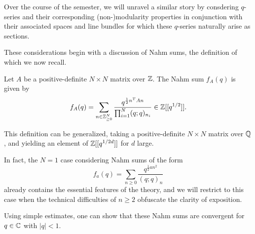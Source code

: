 Over the course of the semester, we will unravel a similar story by consdering $q$-series and their corresponding (non-)modularity properties in conjunction with their associated spaces and line bundles for which these $q$-series naturally arise as sections. 

These considerations begin with a discussion of Nahm sums, the definition of which we now recall. 
\begin{definition}\label{def: Nahm sum}
    Let $A$ be a positive-definite $N\times N$ matrix over $\mathbb{Z}$. The Nahm sum $f_{A}(q)$ is given by 
    $$f_{A}(q)=\sum_{n\in\mathbb{Z}_{\geq0}^{N}}\frac{q^{\frac{1}{2}n^{T}An}}{\prod_{i=1}^{N}(q;q)_{n_{i}}}\in\mathbb{Z}[[q^{1/2}]].$$
\end{definition}
\begin{remark}
    This definition can be generalized, taking a positive-definite $N\times N$ matrix over $\mathbb{Q}$, and yielding an element of $\mathbb{Z}[[q^{1/2d}]]$ for $d$ large. 
\end{remark}
\begin{remark}
    In fact, the $N=1$ case considering Nahm sums of the form 
    $$f_{a}(q)=\sum_{n\geq0}\frac{q^{\frac{1}{2}an^{2}}}{(q;q)_{n}}$$
    already contains the essential features of the theory, and we will restrict to this case when the technical difficulties of $n\geq 2$ obfuscate the clarity of exposition. 
\end{remark}
Using simple estimates, one can show that these Nahm sums are convergent for $q\in\mathbb{C}$ with $|q|<1$. 

